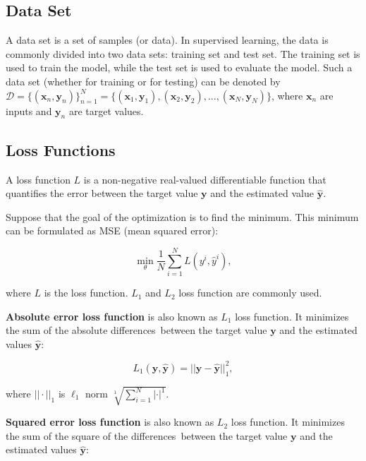 \documentclass[
	parskip, 			   %
	twoside, 			   %
	DIV=14, 			   %
	BCOR=15.0mm, 		   %
	headsepline, 		   %
	open=right, 		   %
	captions=tableheading, %
	bibliography=totoc,    %
	numbers=noenddot       %
]{scrreprt}
\begin{document}
\subsection{Data Set}
A data set is a set of samples (or data). In supervised learning, the data is commonly divided into two data sets: training set and test set. The training set is used to train the model, while the test set is used to evaluate the model. Such a data set (whether for training or for testing) can be denoted by $\mathcal{D}=\{ (\mathbf{x}_{n}, \mathbf{y}_{n}) \}_{n=1}^{N} = \{ (\mathbf{x}_{1}, \mathbf{y}_{1}),  (\mathbf{x}_{2}, \mathbf{y}_{2}), ..., (\mathbf{x}_{N}, \mathbf{y}_{N}) \}$, where $\mathbf{x}_{n}$ are inputs and $\mathbf{y}_{n}$ are target values.

\subsection{Loss Functions}
A loss function $L$ is a non-negative real-valued differentiable function that quantifies the error between the target value $\mathbf{y}$ and the estimated value $\hat{\mathbf{y}}$. 

Suppose that the goal of the optimization is to find the minimum. This minimum can be formulated as MSE (mean squared error):

\begin{equation}
    \label{eq:minimum}
    \min _\theta \frac{1}{N} \sum_{i=1}^N L\left(y^i, \hat{y}^i\right),
\end{equation}

where $L$ is the loss function. $L_{1}$ and $L_{2}$ loss function are commonly used.

\textbf{Absolute error loss function} is also known as $L_{1}$ loss function. It minimizes the sum of the absolute differences between the target value $\mathbf{y}$ and the estimated values $\hat{\mathbf{y}}$:

\begin{equation}
    \label{eq:AE_loss}
    L_{1}( \mathbf{y}, \hat{\mathbf{y}} ) = ||\mathbf{y}-\hat{\mathbf{y}}||^{2}_{1},
\end{equation}

where $|| \cdot ||_{1}$ is $\ell_1$ norm $\sqrt[1]{\sum_{i=1}^N | \cdot |^1}$.

\textbf{Squared error loss function} is also known as $L_{2}$ loss function. It minimizes the sum of the square of the differences between the target value $\mathbf{y}$ and the estimated values $\hat{\mathbf{y}}$:
\end{document}

